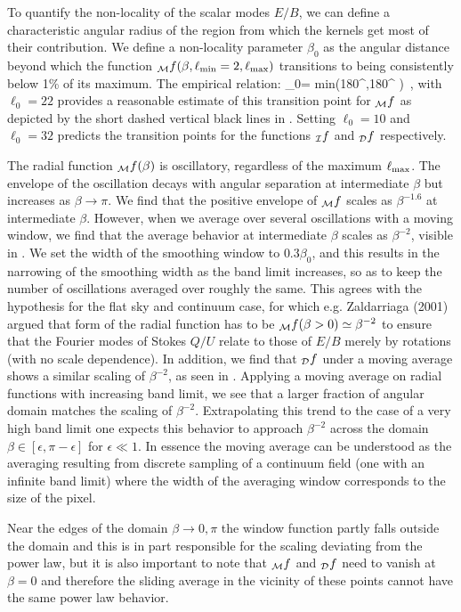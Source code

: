 To quantify the non-locality of the scalar modes $E/B$, we can define a characteristic angular radius of the region from which the kernels get most of their contribution.   We define a non-locality parameter $\beta_{0}$ as the angular distance beyond which the function ${_{\mathcal{M}}f}(\beta,\ell_{\rm min}=2,\ell_{\rm max})$ transitions to being consistently below 1\% of its maximum.
The empirical relation:
\beq
\beta_0= {\rm min}\left(180^\circ,180^\circ {} \right) \,,
\eeq
with $\ell_{0}=22$ provides a reasonable estimate of this transition point for ${}_{\mathcal{M}}f$ as depicted by the short dashed vertical black lines in . Setting $\ell_{0}=10$ and $\ell_{0}=32$ predicts the transition points for the functions ${}_{\mathcal{I}}f$ and  ${}_{\mathcal{D}}f$ respectively.

The radial function ${}_{\mathcal{M}} f(\beta)$ is oscillatory, regardless of the maximum $\ell_{\rm max}$. The envelope of the oscillation decays with angular separation at intermediate $\beta$ but increases as $\beta \rightarrow \pi$.  We find that the positive envelope of ${}_{\mathcal{M}}f$ scales as $\beta^{-1.6}$ at intermediate $\beta$.  However, when we average over several oscillations with a moving window, we find that the average behavior at intermediate $\beta$ scales as $\beta^{-2}$, visible in . We set the width of the smoothing window to $0.3\beta_0$, and this results in the narrowing of the smoothing width as the band limit increases, so as to keep the number of oscillations averaged over roughly the same.  This agrees with the hypothesis for the {flat sky and continuum case}, for which e.g. Zaldarriaga (2001) \cite{Zaldarriaga2001a} argued that form of the radial function has to be ${}_{\mathcal{M}} f(\beta>0)\simeq\beta^{-2}$ to ensure that the Fourier modes of Stokes $Q/U$ relate to those of $E/B$ merely by rotations (with no scale dependence). In addition, we find that ${}_{\mathcal{D}}f$ under a moving average shows a similar scaling of $\beta^{-2}$, as seen in .
Applying a moving average on radial functions with increasing band limit, we see that a larger fraction of angular domain matches the scaling of $\beta^{-2}$.   Extrapolating this trend to the case of a very high band limit one expects this behavior to approach $\beta^{-2}$ across the domain $\beta\in[\epsilon,\pi-\epsilon]$ for $\epsilon \ll 1$. In essence the moving average can be understood as the averaging resulting from discrete sampling of a continuum field (one with an infinite band limit) where the width of the averaging window corresponds to the size of the pixel.

Near the edges of the domain $\beta \rightarrow 0,\pi$ the window function partly falls outside the domain and this is in part responsible for the scaling deviating from the power law, but it is also important to note that ${}_{\mathcal{M}}f$ and ${}_{\mathcal{D}}f$ need to vanish at $\beta=0$ and therefore the sliding average in the vicinity of these points cannot have the same power law behavior.
